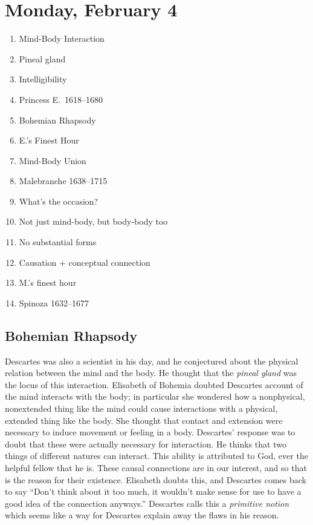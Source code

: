 
\section{Monday, February 4}

\begin{multicols}{2}
\begin{enumerate}
\item Mind-Body Interaction
\item Pineal gland
\item Intelligibility
\item Princess E.\ 1618--1680
\item Bohemian Rhapsody
\item E.'s Finest Hour
\item Mind-Body Union
\item Malebranche 1638--1715
\item What's the occasion?
\item Not just mind-body, but body-body too
\item No substantial forms
\item Causation + conceptual connection
\item M.'s finest hour
\item Spinoza 1632--1677
\end{enumerate}
\end{multicols}

\subsection{Bohemian Rhapsody}

Descartes was also a scientist in his day, and he conjectured about the physical relation between the mind and the body. He thought that the \emph{pineal gland} was the locus of this interaction. Elisabeth of Bohemia doubted Descartes account of the mind interacts with the body; in particular she wondered how a nonphysical, nonextended thing like the mind could cause interactions with a physical, extended thing like the body. She thought that contact and extension were necessary to induce movement or feeling in a body. Descartes' response was to doubt that these were actually necessary for interaction. He thinks that two things of different natures can interact. This ability is attributed to God, ever the helpful fellow that he is. These causal connections are in our interest, and so that is the reason for their existence. Elisabeth doubts this, and Descartes comes back to say ``Don't think about it too much, it wouldn't make sense for use to have a good idea of the connection anyways.'' Descartes calls this a \emph{primitive notion} which seems like a way for Descartes explain away the flaws in his reason.

